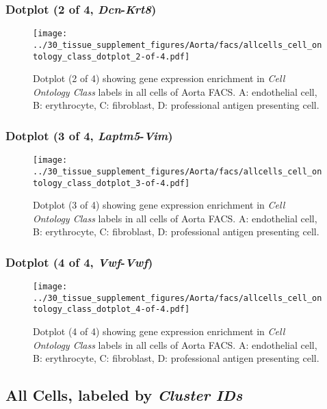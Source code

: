 \clearpage

\subsubsection{Dotplot (2 of 4, \emph{Dcn}-\emph{Krt8})}
\begin{figure}[h]
\centering
\texttt{[image: ../30\_tissue\_supplement\_figures/Aorta/facs/allcells\_cell\_ontology\_class\_dotplot\_2-of-4.pdf]}

\caption{ Dotplot (2 of 4)  showing gene expression enrichment in \emph{Cell Ontology Class} labels in all cells of Aorta FACS. A: endothelial cell, B: erythrocyte, C: fibroblast, D: professional antigen presenting cell.}
\end{figure}


\clearpage

\subsubsection{Dotplot (3 of 4, \emph{Laptm5}-\emph{Vim})}
\begin{figure}[h]
\centering
\texttt{[image: ../30\_tissue\_supplement\_figures/Aorta/facs/allcells\_cell\_ontology\_class\_dotplot\_3-of-4.pdf]}

\caption{ Dotplot (3 of 4)  showing gene expression enrichment in \emph{Cell Ontology Class} labels in all cells of Aorta FACS. A: endothelial cell, B: erythrocyte, C: fibroblast, D: professional antigen presenting cell.}
\end{figure}


\clearpage

\subsubsection{Dotplot (4 of 4, \emph{Vwf}-\emph{Vwf})}
\begin{figure}[h]
\centering
\texttt{[image: ../30\_tissue\_supplement\_figures/Aorta/facs/allcells\_cell\_ontology\_class\_dotplot\_4-of-4.pdf]}

\caption{ Dotplot (4 of 4)  showing gene expression enrichment in \emph{Cell Ontology Class} labels in all cells of Aorta FACS. A: endothelial cell, B: erythrocyte, C: fibroblast, D: professional antigen presenting cell.}
\end{figure}


\clearpage

\subsection{All Cells, labeled by \emph{Cluster IDs}}
